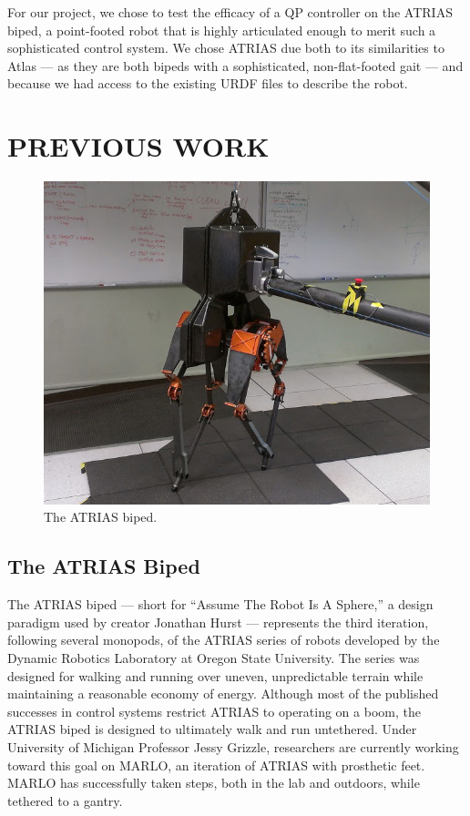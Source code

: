 \documentclass[letterpaper, 10 pt, conference]{ieeeconf}  %
\begin{document}
For our project, we chose to test the efficacy of a QP controller on the ATRIAS biped, a point-footed robot that is highly articulated enough to merit such a sophisticated control system. We chose ATRIAS due both to its similarities to Atlas --- as they are both bipeds with a sophisticated, non-flat-footed gait --- and because we had access to the existing URDF files to describe the robot.

\section{PREVIOUS WORK}

   \begin{figure}[thpb]
      \centering
      \includegraphics[scale=0.37]{figures/atrias.jpg}
      \caption{The ATRIAS biped.}
      \label{atrias}
   \end{figure}

\subsection{The ATRIAS Biped}

The ATRIAS biped --- short for ``Assume The Robot Is A Sphere,'' a design paradigm used by creator Jonathan Hurst --- represents the third iteration, following several monopods, of the ATRIAS series of robots developed by the Dynamic Robotics Laboratory at Oregon State University. The series was designed for walking and running over uneven, unpredictable terrain while maintaining a reasonable economy of energy. \cite{site1} Although most of the published successes in control systems restrict ATRIAS to operating on a boom, the ATRIAS biped is designed to ultimately walk and run untethered. Under University of Michigan Professor Jessy Grizzle, researchers are currently working toward this goal on MARLO, an iteration of ATRIAS with prosthetic feet. MARLO has successfully taken steps, both in the lab and outdoors, while tethered to a gantry. \cite{site2}
\end{document}
